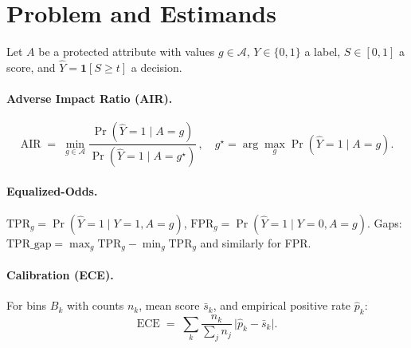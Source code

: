 
\section{Problem and Estimands}
Let $A$ be a protected attribute with values $g\in\mathcal{A}$, $Y\in\{0,1\}$ a label, $S\in[0,1]$ a score, and $\hat{Y}=\mathbf{1}[S\ge t]$ a decision.

\paragraph{Adverse Impact Ratio (AIR).}
\begin{equation}
\mathrm{AIR} \;=\; \min_{g\in\mathcal{A}} \frac{\Pr(\hat{Y}=1\mid A=g)}{\Pr(\hat{Y}=1\mid A=g^\star)}\,,\quad
g^\star=\arg\max_g \Pr(\hat{Y}=1\mid A=g).
\end{equation}

\paragraph{Equalized-Odds.}
$\mathrm{TPR}_g=\Pr(\hat{Y}=1\!\mid\!Y=1,A=g)$,\quad
$\mathrm{FPR}_g=\Pr(\hat{Y}=1\!\mid\!Y=0,A=g)$.
Gaps: $\mathrm{TPR\_gap}=\max_g \mathrm{TPR}_g-\min_g \mathrm{TPR}_g$ and similarly for FPR.

\paragraph{Calibration (ECE).}
For bins $B_k$ with counts $n_k$, mean score $\bar s_k$, and empirical positive rate $\hat p_k$:
\begin{equation}
\mathrm{ECE} \;=\; \sum_k \frac{n_k}{\sum_j n_j} \,\lvert \hat p_k - \bar s_k\rvert.
\end{equation}
